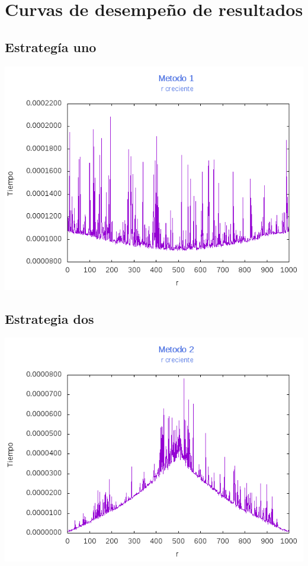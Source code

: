 \documentclass[12pt,letterpaper]{scrartcl}
\begin{document}
\newpage

\section{Curvas de desempeño de resultados}

\subsection{Estrategía uno}

\includegraphics[scale=1]{Metodo1/plot1m1}

\subsection{Estrategia dos}

\includegraphics[scale=1]{Metodo2/plot1m2}
\end{document}
